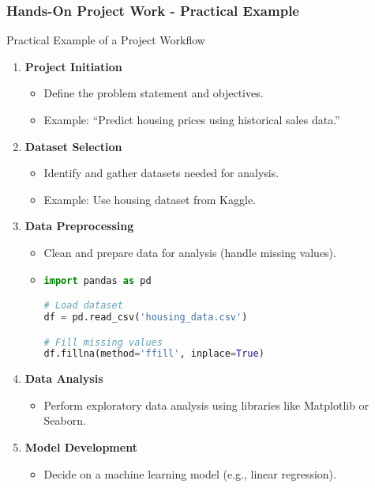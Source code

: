 \documentclass[aspectratio=169]{beamer}
\begin{document}
\begin{frame}[fragile]
    \frametitle{Hands-On Project Work - Practical Example}
    \begin{block}{Practical Example of a Project Workflow}
        \begin{enumerate}
            \item \textbf{Project Initiation}
            \begin{itemize}
                \item Define the problem statement and objectives.
                \item Example: “Predict housing prices using historical sales data.”
            \end{itemize}
            
            \item \textbf{Dataset Selection}
            \begin{itemize}
                \item Identify and gather datasets needed for analysis.
                \item Example: Use housing dataset from Kaggle.
            \end{itemize}
            
            \item \textbf{Data Preprocessing}
            \begin{itemize}
                \item Clean and prepare data for analysis (handle missing values).
                \item \begin{lstlisting}[language=Python]
import pandas as pd

# Load dataset
df = pd.read_csv('housing_data.csv')

# Fill missing values
df.fillna(method='ffill', inplace=True)
                \end{lstlisting}
            \end{itemize}
            
            \item \textbf{Data Analysis}
            \begin{itemize}
                \item Perform exploratory data analysis using libraries like Matplotlib or Seaborn.
            \end{itemize}
            
            \item \textbf{Model Development}
            \begin{itemize}
                \item Decide on a machine learning model (e.g., linear regression).
            \end{itemize}
            

\end{enumerate}
\end{block}
\end{frame}
\end{document}
